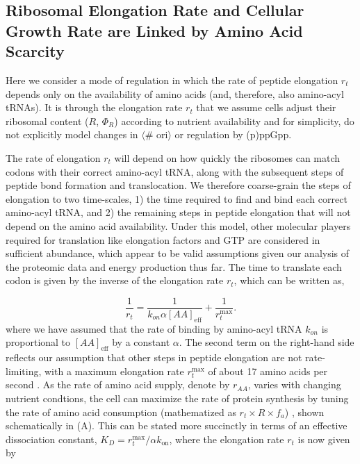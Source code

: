 \subsection{Ribosomal Elongation Rate and Cellular Growth Rate are Linked by
Amino Acid Scarcity}
Here we consider a mode of regulation in which the rate of peptide elongation
$r_t$ depends only on the availability of amino acids (and, therefore, also
amino-acyl tRNAs). It is through the elongation rate $r_t$ that we assume cells
adjust their ribosomal content ($R$, $\Phi_R$) according to nutrient
availability and for simplicity, do not explicitly model changes in  $\langle$\#
ori$\rangle$ or regulation by (p)ppGpp.

The rate of elongation $r_t$ will depend on how quickly the ribosomes can match
codons with their correct amino-acyl tRNA, along with the subsequent steps of
peptide bond formation and translocation. We therefore coarse-grain the steps of
elongation to two time-scales,  1) the time required to find and bind each
correct amino-acyl tRNA, and 2) the remaining steps in peptide elongation that
will not depend on the amino acid availability. Under this model, other
molecular players required for translation like elongation factors and GTP are
considered in sufficient abundance, which appear to be valid assumptions given
our analysis of the proteomic data and energy production thus far. The time to
translate each codon is given by the inverse of the elongation rate $r_t$, which
can be written as,

\begin{equation}
\frac{1}{r_t} = \frac{1}{k_{on} \alpha [AA]_{\text{eff}}} + \frac{1}{r_{t}^{\text{max}}}.
\end{equation}
where we have assumed that the rate of binding by amino-acyl tRNA $k_{on}$ is
proportional to $[AA]_{\text{eff}}$ by a constant $\alpha$. The second term on
the right-hand side reflects our assumption that other steps in peptide
elongation are not rate-limiting, with a maximum elongation rate
$r_{t}^{\text{max}}$ of about 17 amino acids per second \cite{dai2016}. As the
rate of amino acid supply, denote by $r_{AA}$, varies with changing nutrient
condtions, the cell can maximize the rate of protein synthesis by tuning the
rate of amino acid consumption (mathematized as $r_t \times R \times f_a$) ,
shown schematically in (A). This can be stated more
succinctly in terms of an effective dissociation constant, $K_D = r_{t}^{\text{max}} / \alpha k_\text{on}$, where the elongation rate $r_t$ is now given by

